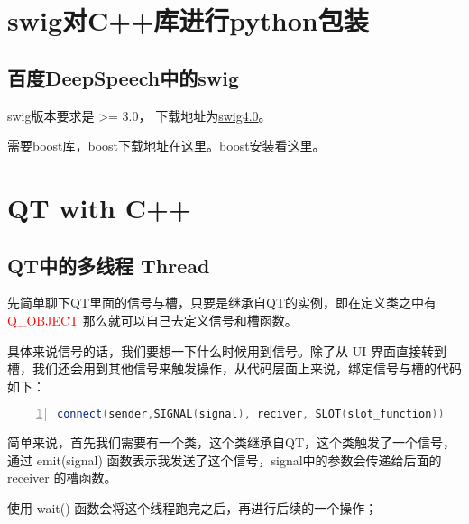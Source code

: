 \section{swig对C++库进行python包装}

\subsection{百度DeepSpeech中的swig}


swig版本要求是 >= 3.0， 下载地址为\href{https://sourceforge.net/projects/swig/files/swig/swig-4.0.1/swig-4.0.1.tar.gz/download?use_mirror=nchc}{swig4.0}。

需要boost库，boost下载地址在\href{https://dl.bintray.com/boostorg/release/1.67.0/source/boost_1_67_0.tar.gz}{这里}。boost安装看\href{https://blog.csdn.net/zhangzq86/article/details/81082810}{这里}。



\section{QT with C++}
\subsection{QT中的多线程 Thread}

先简单聊下QT里面的信号与槽，只要是继承自QT的实例，即在定义类之中有 \textcolor{red}{Q_OBJECT} 那么就可以自己去定义信号和槽函数。

具体来说信号的话，我们要想一下什么时候用到信号。除了从 UI 界面直接转到槽，我们还会用到其他信号来触发操作，从代码层面上来说，绑定信号与槽的代码如下：
\begin{lstlisting}[language=C++, numbers=left, 
         numberstyle=\tiny,keywordstyle=\color{blue!70},
         commentstyle=\color{red!50!green!50!blue!50},frame=shadowbox,
         rulesepcolor=\color{red!20!green!20!blue!20},basicstyle=\ttfamily]
connect(sender,SIGNAL(signal), reciver, SLOT(slot_function))
\end{lstlisting}	

简单来说，首先我们需要有一个类，这个类继承自QT，这个类触发了一个信号，通过 emit(signal) 函数表示我发送了这个信号，signal中的参数会传递给后面的 receiver 的槽函数。

使用 wait() 函数会将这个线程跑完之后，再进行后续的一个操作；